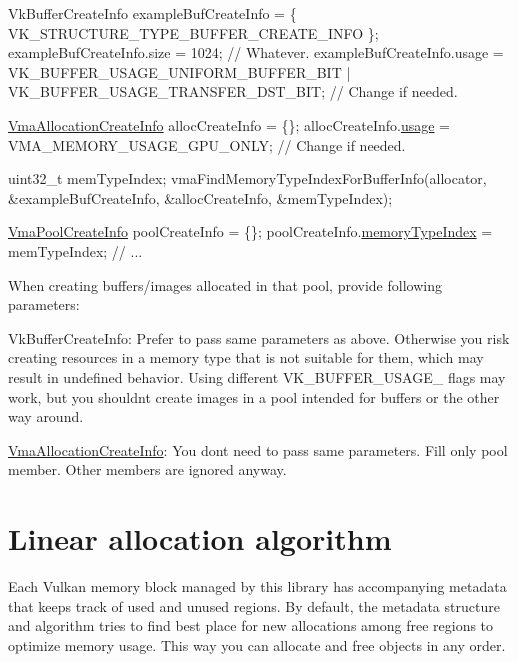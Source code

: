 \begin{DoxyCode}
VkBufferCreateInfo exampleBufCreateInfo = \{ VK\_STRUCTURE\_TYPE\_BUFFER\_CREATE\_INFO \};
exampleBufCreateInfo.size = 1024; \textcolor{comment}{// Whatever.}
exampleBufCreateInfo.usage = VK\_BUFFER\_USAGE\_UNIFORM\_BUFFER\_BIT | VK\_BUFFER\_USAGE\_TRANSFER\_DST\_BIT; \textcolor{comment}{//
       Change if needed.}

\hyperlink{structVmaAllocationCreateInfo}{VmaAllocationCreateInfo} allocCreateInfo = \{\};
allocCreateInfo.\hyperlink{structVmaAllocationCreateInfo_accb8b06b1f677d858cb9af20705fa910}{usage} = VMA\_MEMORY\_USAGE\_GPU\_ONLY; \textcolor{comment}{// Change if needed.}

uint32\_t memTypeIndex;
vmaFindMemoryTypeIndexForBufferInfo(allocator, &exampleBufCreateInfo, &allocCreateInfo, &memTypeIndex);

\hyperlink{structVmaPoolCreateInfo}{VmaPoolCreateInfo} poolCreateInfo = \{\};
poolCreateInfo.\hyperlink{structVmaPoolCreateInfo_a596fa76b685d3f1f688f84a709a5b319}{memoryTypeIndex} = memTypeIndex;
\textcolor{comment}{// ...}
\end{DoxyCode}


When creating buffers/images allocated in that pool, provide following parameters\+:


\begin{DoxyItemize}
\item {\ttfamily Vk\+Buffer\+Create\+Info}\+: Prefer to pass same parameters as above. Otherwise you risk creating resources in a memory type that is not suitable for them, which may result in undefined behavior. Using different {\ttfamily V\+K\+\_\+\+B\+U\+F\+F\+E\+R\+\_\+\+U\+S\+A\+G\+E\+\_\+} flags may work, but you shouldn\textquotesingle{}t create images in a pool intended for buffers or the other way around.
\item \hyperlink{structVmaAllocationCreateInfo}{Vma\+Allocation\+Create\+Info}\+: You don\textquotesingle{}t need to pass same parameters. Fill only {\ttfamily pool} member. Other members are ignored anyway.
\end{DoxyItemize}\hypertarget{custom_memory_pools_linear_algorithm}{}\section{Linear allocation algorithm}\label{custom_memory_pools_linear_algorithm}
Each Vulkan memory block managed by this library has accompanying metadata that keeps track of used and unused regions. By default, the metadata structure and algorithm tries to find best place for new allocations among free regions to optimize memory usage. This way you can allocate and free objects in any order.



